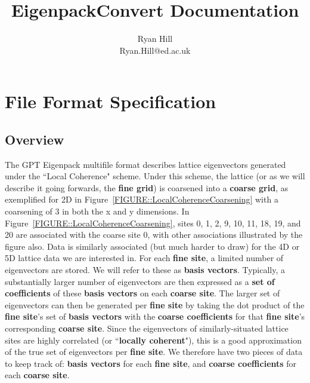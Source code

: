 \documentclass{article}
\title{EigenpackConvert Documentation}
\author{Ryan Hill\\ Ryan.Hill@ed.ac.uk}
\begin{document}
\maketitle
\tableofcontents
\newpage
\section{File Format Specification}
\subsection{Overview}
The GPT Eigenpack multifile format describes lattice eigenvectors generated under the ``Local Coherence" scheme. Under this scheme, the lattice (or as we will describe it going forwards, the \textbf{fine grid}) is coarsened into a \textbf{coarse grid}, as exemplified for 2D in Figure~\ref{FIGURE::LocalCoherenceCoarsening} with a coarsening of 3 in both the x and y dimensions. In Figure~\ref{FIGURE::LocalCoherenceCoarsening}, sites 0, 1, 2, 9, 10, 11, 18, 19, and 20 are associated with the coarse site 0, with other associations illustrated by the figure also. Data is similarly associated (but much harder to draw) for the 4D or 5D lattice data we are interested in. For each \textbf{fine site}, a limited number of eigenvectors are stored. We will refer to these as \textbf{basis vectors}. Typically, a substantially larger number of eigenvectors are then expressed as a \textbf{set of coefficients} of these \textbf{basis vectors} on each \textbf{coarse site}. The larger set of eigenvectors can then be generated per \textbf{fine site} by taking the dot product of the \textbf{fine site}'s set of \textbf{basis vectors} with the \textbf{coarse coefficients} for that \textbf{fine site}'s corresponding \textbf{coarse site}. Since the eigenvectors of similarly-situated lattice sites are highly correlated (or ``\textbf{locally coherent}"), this is a good approximation of the true set of eigenvectors per \textbf{fine site}. We therefore have two pieces of data to keep track of: \textbf{basis vectors} for each \textbf{fine site}, and \textbf{coarse coefficients} for each \textbf{coarse site}.\\
\end{document}
